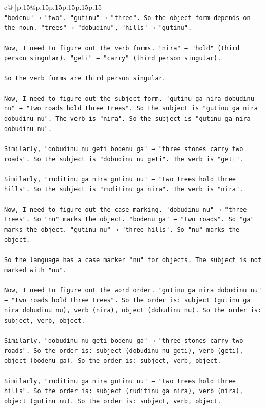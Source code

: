 \documentclass{article}
\begin{document}
{\begin{supertabular}{c@{$\;$}|p{.15\linewidth}@{}p{.15\linewidth}p{.15\linewidth}p{.15\linewidth}p{.15\linewidth}p{.15\linewidth}}
{{{\\ 
\texttt{"bodenu" → "two". "gutinu" → "three". So the object form depends on the noun. "trees" → "dobudinu", "hills" → "gutinu".} \\
\\ 
\texttt{Now, I need to figure out the verb forms. "nira" → "hold" (third person singular). "geti" → "carry" (third person singular).} \\
\\ 
\texttt{So the verb forms are third person singular.} \\
\\ 
\texttt{Now, I need to figure out the subject form. "gutinu ga nira dobudinu nu" → "two roads hold three trees". So the subject is "gutinu ga nira dobudinu nu". The verb is "nira". So the subject is "gutinu ga nira dobudinu nu".} \\
\\ 
\texttt{Similarly, "dobudinu nu geti bodenu ga" → "three stones carry two roads". So the subject is "dobudinu nu geti". The verb is "geti".} \\
\\ 
\texttt{Similarly, "ruditinu ga nira gutinu nu" → "two trees hold three hills". So the subject is "ruditinu ga nira". The verb is "nira".} \\
\\ 
\texttt{Now, I need to figure out the case marking. "dobudinu nu" → "three trees". So "nu" marks the object. "bodenu ga" → "two roads". So "ga" marks the object. "gutinu nu" → "three hills". So "nu" marks the object.} \\
\\ 
\texttt{So the language has a case marker "nu" for objects. The subject is not marked with "nu".} \\
\\ 
\texttt{Now, I need to figure out the word order. "gutinu ga nira dobudinu nu" → "two roads hold three trees". So the order is: subject (gutinu ga nira dobudinu nu), verb (nira), object (dobudinu nu). So the order is: subject, verb, object.} \\
\\ 
\texttt{Similarly, "dobudinu nu geti bodenu ga" → "three stones carry two roads". So the order is: subject (dobudinu nu geti), verb (geti), object (bodenu ga). So the order is: subject, verb, object.} \\
\\ 
\texttt{Similarly, "ruditinu ga nira gutinu nu" → "two trees hold three hills". So the order is: subject (ruditinu ga nira), verb (nira), object (gutinu nu). So the order is: subject, verb, object.} \\
}}}
\end{supertabular}}
\end{document}

